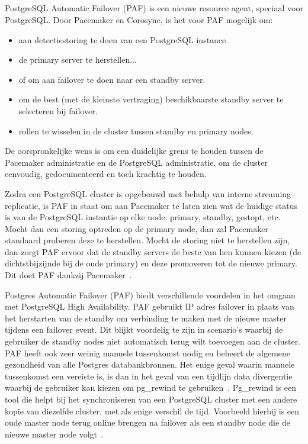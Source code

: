 \subsection{}
\label{subsec:PostgreSQL Automatic Failover (PAF)}

PostgreSQL Automatic Failover (PAF) is een nieuwe resource agent, speciaal voor PostgreSQL. Door Pacemaker en Corosync, is het voor PAF mogelijk om:

\begin{itemize}
    \item aan detectiestoring te doen van een PostgreSQL instance.
    \item de primary server te herstellen...
    \item of om aan failover te doen naar een standby server.
    \item om de best (met de kleinste vertraging) beschikbaarste standby server te selecteren bij failover.
    \item rollen te wisselen in de cluster tussen standby en primary nodes.
\end{itemize}

De oorspronkelijke wens is om een duidelijke grens te houden tussen de Pacemaker administratie en de PostgreSQL administratie, om de cluster eenvoudig, gedocumenteerd en toch krachtig te houden.

Zodra een PostgreSQL cluster is opgebouwd met behulp van interne streaming replicatie, is PAF in staat om aan Pacemaker te laten zien wat de huidige status is van de PostgreSQL instantie op elke node: primary, standby, gestopt, etc. Mocht dan een storing optreden op de primary node, dan zal Pacemaker standaard proberen deze te herstellen. Mocht de storing niet te herstellen zijn, dan zorgt PAF ervoor dat de standby servers de beste van hen kunnen kiezen (de dichtstbijzijnde bij de oude primary) en deze promoveren tot de nieuwe primary. Dit doet PAF dankzij Pacemaker~\autocite{Rimbault2020}. %

Postgres Automatic Failover (PAF) biedt verschillende voordelen in het omgaan met PostgreSQL High Availability. PAF gebruikt IP adres failover in plaats van het herstarten van de standby om verbinding te maken met de nieuwe master tijdens een failover event. Dit blijkt voordelig te zijn in scenario's waarbij de gebruiker de standby nodes niet automatisch terug wilt toevoegen aan de cluster. PAF heeft ook zeer weinig manuele tussenkomst nodig en beheert de algemene gezondheid van alle Postgres databankbronnen. Het enige geval waarin manuele tussenkomst een vereiste is, is dan in het geval van een tijdlijn data divergentie waarbij de gebruiker kan kiezen om pg\_rewind te gebruiken~\autocite{ScaleGrid2018a}. Pg\_rewind is een tool die helpt bij het synchroniseren van een PostgreSQL cluster met een andere kopie van diezelfde cluster, met als enige verschil de tijd. Voorbeeld hierbij is een oude master node terug online brengen na failover als een standby node die de nieuwe master node volgt~\autocite{PostgreSQL2021b}. %

